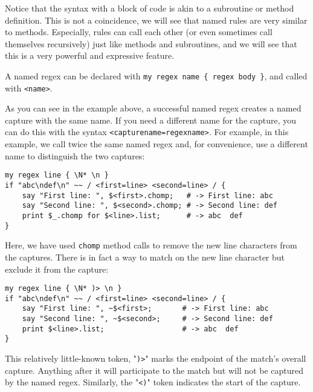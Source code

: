 Notice that the syntax with a block of code is akin 
to a subroutine or method definition. This is not a 
coincidence, we will see that named rules are very 
similar to methods. Especially, rules can call 
each other (or even sometimes call themselves 
recursively) just like methods and subroutines, and we will see 
that this is a very powerful and expressive feature.

A named regex can be declared with 
\verb'my regex name { regex body }', and called with 
{\tt <name>}. 

As you can see in the example above, a successful named 
regex creates a named capture with the same name. If you 
need a different name for the capture, you can do this 
with the syntax {\tt <capturename=regexname>}. For example,
in this example, we call twice the same named regex and, 
for convenience, use a different name to distinguish 
the two captures:

\begin{verbatim}
my regex line { \N* \n }
if "abc\ndef\n" ~~ / <first=line> <second=line> / {
    say "First line: ", $<first>.chomp;   # -> First line: abc
    say "Second line: ", $<second>.chomp; # -> Second line: def
    print $_.chomp for $<line>.list;      # -> abc  def
}
\end{verbatim}

Here, we have used {\tt chomp} method calls to remove 
the new line characters from the captures. There is in 
fact a way to match on the new line character but exclude 
it from the capture:
\begin{verbatim}
my regex line { \N* )> \n }
if "abc\ndef\n" ~~ / <first=line> <second=line> / {
    say "First line: ", ~$<first>;       # -> First line: abc
    say "Second line: ", ~$<second>;     # -> Second line: def
    print $<line>.list;                  # -> abc  def
}
\end{verbatim}

This relatively little-known token, "\verb')>'" marks 
the endpoint of the match's overall capture. Anything 
after it will participate to the match but will not 
be captured by the named regex. Similarly, the "\verb'<)'" 
token indicates the start of the capture.

